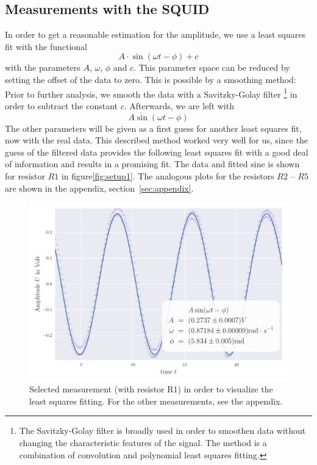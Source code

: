 \subsection{Measurements with the SQUID}
In order to get a reasonable estimation for the amplitude, we use a least
squares fit with the functional
\begin{equation}
A \cdot \sin (\omega t - \phi ) + c
\end{equation}
with the parameters $A$, $\omega$, $\phi$ and $c$. This parameter space can be
reduced by setting the offset of the data to zero. This is possible by a 
smoothing method: Prior to further analysis, we smooth the data with a
Savitzky-Golay filter%
\footnote{The Savitzky-Golay filter is broadly used
in order to smoothen data without changing the characteristic features of the 
signal. The method is a combination of convolution and polynomial least
squares fitting.} 
in order to subtract the constant $c$. Afterwards, we are left with
\begin{equation}
A \dot \sin (\omega t - \phi ) 
\end{equation}
The other parameters will be given as
a first guess for another least squares fit, now with the real data. This
described method worked very well for us, since the guess of the filtered data
provides the following least squares fit with a good deal of information and
results in a promising fit. The data and fitted sine is shown for 
resistor $R1$ in figure\ref{fig:setup1}. The analogous plots for the 
resistors $R2$ -- $R5$ are shown in the appendix, section~\ref{sec:appendix}.
\begin{figure}[H]
    \centering
    \includegraphics[width=1\linewidth]{analysis/figures/fit4_1}
    \caption{Selected measurement (with resistor R1) in order to visualize the least squares
    fitting. For the other measurements, see the appendix.}
    \label{fig:4_1_plot}
\end{figure}

